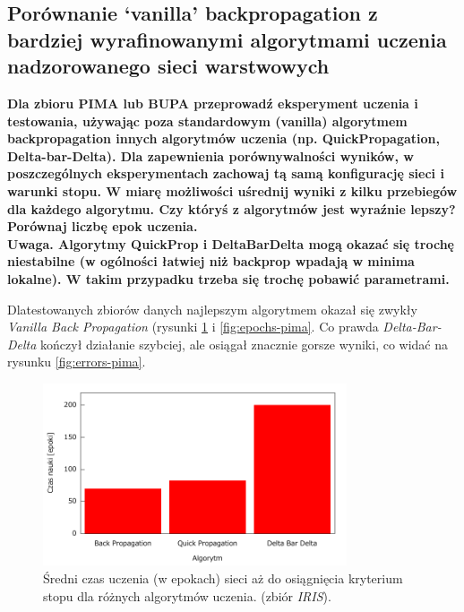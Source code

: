\subsection{Porównanie ‘vanilla’ backpropagation z bardziej wyrafinowanymi algorytmami uczenia nadzorowanego sieci warstwowych}
\textbf{Dla zbioru PIMA lub BUPA przeprowadź eksperyment uczenia i testowania, używając poza standardowym (vanilla) algorytmem backpropagation innych algorytmów uczenia (np. QuickPropagation, Delta-bar-Delta). Dla zapewnienia porównywalności wyników, w poszczególnych eksperymentach zachowaj tą samą konfigurację sieci i warunki stopu. W miarę możliwości uśrednij wyniki z kilku przebiegów dla każdego algorytmu. Czy któryś z algorytmów jest wyraźnie lepszy? Porównaj liczbę epok uczenia.
\\
Uwaga. Algorytmy QuickProp i DeltaBarDelta mogą okazać się trochę niestabilne (w ogólności łatwiej niż backprop wpadają w minima lokalne). W takim przypadku trzeba się trochę pobawić parametrami.}

Dlatestowanych zbiorów danych najlepszym algorytmem okazał się zwykły \emph{\textit{Vanilla} Back Propagation} (rysunki \ref{fig:epochs-iris} i \ref{fig:epochs-pima}. Co prawda \emph{Delta-Bar-Delta} kończył działanie szybciej, ale osiągał znacznie gorsze wyniki, co widać na rysunku \ref{fig:errors-pima}.


\begin{figure}[h]
\centering
\includegraphics[width=0.8\textwidth]{dane/part1/zad10/epochs-iris}
\caption{Średni czas uczenia (w epokach) sieci aż do osiągnięcia kryterium stopu dla różnych algorytmów uczenia. (zbiór \emph {IRIS}).\label{fig:epochs-iris}}
\end{figure}

